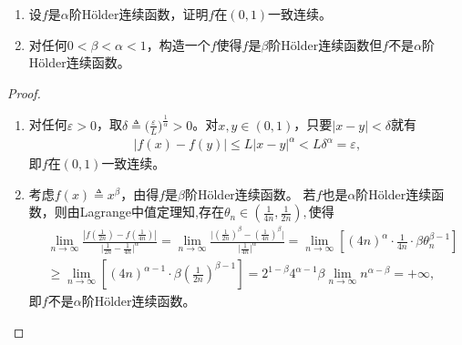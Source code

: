 \documentclass[../../main.tex]{subfiles}%
\begin{document}
\begin{proposition}
\begin{enumerate}[(1)]
\item 设$f$是$\alpha$阶Hölder连续函数，证明$f$在$(0,1)$一致连续。
\item 对任何$0<\beta<\alpha<1$，构造一个$f$使得$f$是$\beta$阶Hölder连续函数但$f$不是$\alpha$阶Hölder连续函数。
\end{enumerate}
\end{proposition}
\begin{proof}
\begin{enumerate}[(1)]
\item 对任何$\varepsilon>0$，取$\delta\triangleq \bigl(\frac{\varepsilon}{L}\bigr)^{\frac{1}{\alpha}}>0$。对$x,y\in(0,1)$，只要$|x-y|<\delta$就有
\begin{align*}
|f(x)-f(y)|\leqslant L|x-y|^\alpha < L\delta^\alpha = \varepsilon,
\end{align*}
即$f$在$(0,1)$一致连续。

\item 考虑$f(x)\triangleq x^\beta$，由得$f$是$\beta$阶Hölder连续函数。
若$f$也是$\alpha$阶Hölder连续函数，则由Lagrange中值定理知,存在$\theta_n\in(\frac{1}{4n},\frac{1}{2n}),$使得
\begin{align*}
&\lim_{n\rightarrow \infty} \frac{|f(\frac{1}{2n})-f(\frac{1}{4n})|}{\bigl| \frac{1}{2n}-\frac{1}{4n} \bigr| ^{\alpha}}=\lim_{n\rightarrow \infty} \frac{\bigl| (\frac{1}{2n})^{\beta}-(\frac{1}{4n})^{\beta} \bigr|}{\bigl| \frac{1}{4n} \bigr| ^{\alpha}}=\lim_{n\rightarrow \infty} \left[ (4n)^{\alpha}\cdot \frac{1}{4n}\cdot \beta \theta _{n}^{\beta -1} \right] 
\\
&\geqslant \lim_{n\rightarrow \infty} \left[ (4n)^{\alpha -1}\cdot \beta \left( \frac{1}{2n} \right) ^{\beta -1} \right] =2^{1-\beta}4^{\alpha -1}\beta \lim_{n\rightarrow \infty} n^{\alpha -\beta}=+\infty ,
\end{align*}
即$f$不是$\alpha$阶Hölder连续函数。
\end{enumerate}
\end{proof}
\end{document}
